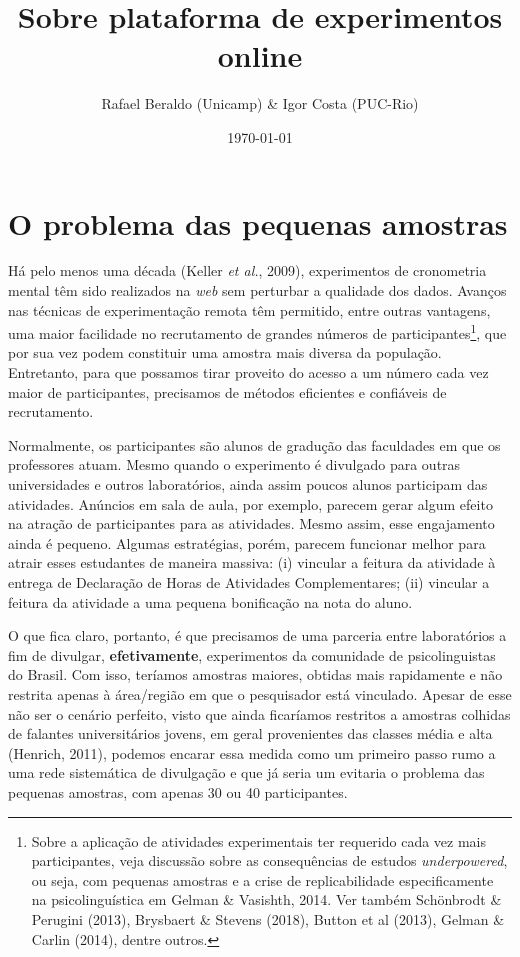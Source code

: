 \documentclass[11pt]{article}
\author{Rafael Beraldo (Unicamp) \& Igor Costa (PUC-Rio)}
\date{\today}
\title{Sobre plataforma de experimentos online}
\begin{document}
\maketitle
\tableofcontents


\section{O problema das pequenas amostras}
\label{sec:orgc083031}

Há pelo menos uma década (Keller \emph{et al.}, 2009), experimentos de cronometria mental têm sido realizados na \emph{web} sem perturbar a qualidade dos dados. Avanços nas técnicas de experimentação remota têm permitido, entre outras vantagens, uma maior facilidade no recrutamento de grandes números de participantes\footnote{Sobre a aplicação de atividades experimentais ter requerido cada vez mais participantes, veja discussão sobre as consequências de estudos \emph{underpowered}, ou seja, com pequenas amostras e a crise de replicabilidade especificamente na psicolinguística em Gelman \& Vasishth, 2014. Ver também Schönbrodt \& Perugini (2013), Brysbaert \& Stevens (2018), Button et al (2013), Gelman \& Carlin (2014), dentre outros.}, que por sua vez podem constituir uma amostra mais diversa da população. Entretanto, para que possamos tirar proveito do acesso a um número cada vez maior de participantes, precisamos de métodos eficientes e confiáveis de recrutamento.

Normalmente, os participantes são alunos de gradução das faculdades em que os professores atuam. Mesmo quando o experimento é divulgado para outras universidades e outros laboratórios, ainda assim poucos alunos participam das atividades. Anúncios em sala de aula, por exemplo, parecem gerar algum efeito na atração de participantes para as atividades. Mesmo assim, esse engajamento ainda é pequeno. Algumas estratégias, porém, parecem funcionar melhor para atrair esses estudantes de maneira massiva: (i) vincular a feitura da atividade à entrega de Declaração de Horas de Atividades Complementares; (ii) vincular a feitura da atividade a uma pequena bonificação na nota do aluno.

O que fica claro, portanto, é que precisamos de uma parceria entre laboratórios a fim de divulgar, \textbf{efetivamente}, experimentos da comunidade de psicolinguistas do Brasil. Com isso, teríamos amostras maiores, obtidas mais rapidamente e não restrita apenas à área/região em que o pesquisador está vinculado. Apesar de esse não ser o cenário perfeito, visto que ainda ficaríamos restritos a amostras colhidas de falantes universitários jovens, em geral provenientes das classes média e alta (Henrich, 2011), podemos encarar essa medida como um primeiro passo rumo a uma rede sistemática de divulgação e que já seria um evitaria o problema das pequenas amostras, com apenas 30 ou 40 participantes.
\end{document}
